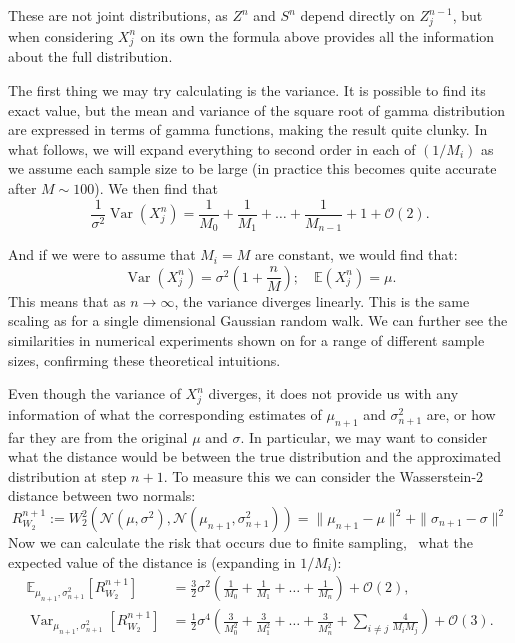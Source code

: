 These are not joint distributions, as $Z^n$ and $S^n$ depend directly on $Z^{n-1}_j$, but when considering $X^n_j$ on its own the formula above provides all the information about the full distribution. %

The first thing we may try calculating is the variance. It is possible to find its exact value, but the mean and variance of the square root of gamma distribution are expressed in terms of gamma functions, making the result quite clunky. In what follows, we will expand everything to second order in each of $(1/M_i)$ as we assume each sample size to be large (in practice this becomes quite accurate after $M\sim100$). We then find that 
$$
\frac{1}{\sigma^2}\operatorname{Var}(X^n_j) = \frac{1}{M_0}+\frac{1}{M_1}+ \dots + \frac{1}{M_{n-1}}+1 + \mathcal{O}(2).
$$

And if we were to assume that $M_i = M$ are constant, we would find that:
$$
\operatorname{Var}(X^n_j) = \sigma^2\left(1+\frac{n}{M}\right); \quad \mathbb{E}(X^n_j) = \mu.
$$
This means that as $n\to\infty$, the variance diverges linearly. This is the same scaling as for a single dimensional Gaussian random walk. We can further see the similarities in numerical experiments shown on  for a range of different sample sizes, confirming these theoretical intuitions.

Even though the variance of $X^n_j$ diverges, it does not provide us with any information of what the corresponding estimates of $\mu_{n+1}$ and $\sigma^2_{n+1}$ are, or how far they are from the original $\mu$ and $\sigma$. In particular, we may want to consider what the distance would be between the true distribution and the approximated distribution at step $n+1$. To measure this we can consider the Wasserstein-2 distance between two normals:
\begin{equation*}
R^{n+1}_{W_2} := W^2_2\left(\mathcal{N}(\mu,\sigma^2),\mathcal{N}(\mu_{n+1},\sigma^2_{n+1})\right)=\|\mu_{n+1}-\mu\|^2 + \|\sigma_{n+1}-\sigma\|^2
\end{equation*}
Now we can calculate the risk that occurs due to finite sampling, \ie~what the expected value of the distance is (expanding in $1/M_i$): 
\begin{align}
\label{eq:mean_risk}
\mathbb{E}_{\mu_{n+1},\sigma_{n+1}^2}\left[R^{n+1}_{W_2}\right]&=\frac{3}{2}\sigma^2\left(\frac{1}{M_0}+\frac{1}{M_1}+ \dots + \frac{1}{M_{n}}\right)+\mathcal{O}(2),\\
\operatorname{Var}_{\mu_{n+1},\sigma_{n+1}^2}\left[R^{n+1}_{W_2}\right]&=\frac{1}{2}\sigma^4\left(\frac{3}{M_0^2}+\frac{3}{M_1^2}+ \dots + \frac{3}{M_{n}^2} + \sum_{i\neq j}\frac{4}{M_iM_j}\right)+\mathcal{O}(3).
\end{align}

